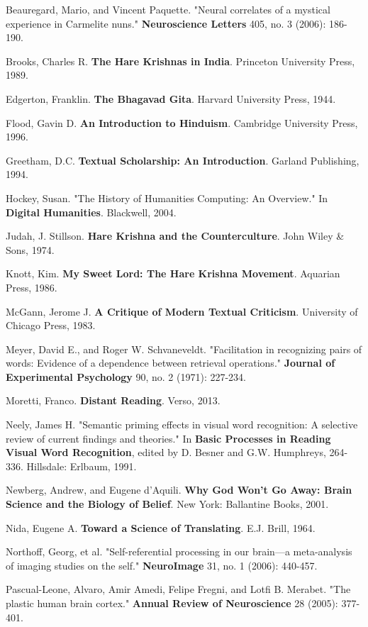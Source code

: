 \documentclass[11pt,twoside]{book}
\begin{document}
Beauregard, Mario, and Vincent Paquette. "Neural correlates of a mystical experience in Carmelite nuns." \textbf{Neuroscience Letters} 405, no. 3 (2006): 186-190.

Brooks, Charles R. \textbf{The Hare Krishnas in India}. Princeton University Press, 1989.

Edgerton, Franklin. \textbf{The Bhagavad Gita}. Harvard University Press, 1944.

Flood, Gavin D. \textbf{An Introduction to Hinduism}. Cambridge University Press, 1996.

Greetham, D.C. \textbf{Textual Scholarship: An Introduction}. Garland Publishing, 1994.

Hockey, Susan. "The History of Humanities Computing: An Overview." In \textbf{Digital Humanities}. Blackwell, 2004.

Judah, J. Stillson. \textbf{Hare Krishna and the Counterculture}. John Wiley \& Sons, 1974.

Knott, Kim. \textbf{My Sweet Lord: The Hare Krishna Movement}. Aquarian Press, 1986.

McGann, Jerome J. \textbf{A Critique of Modern Textual Criticism}. University of Chicago Press, 1983.

Meyer, David E., and Roger W. Schvaneveldt. "Facilitation in recognizing pairs of words: Evidence of a dependence between retrieval operations." \textbf{Journal of Experimental Psychology} 90, no. 2 (1971): 227-234.

Moretti, Franco. \textbf{Distant Reading}. Verso, 2013.

Neely, James H. "Semantic priming effects in visual word recognition: A selective review of current findings and theories." In \textbf{Basic Processes in Reading Visual Word Recognition}, edited by D. Besner and G.W. Humphreys, 264-336. Hillsdale: Erlbaum, 1991.

Newberg, Andrew, and Eugene d'Aquili. \textbf{Why God Won't Go Away: Brain Science and the Biology of Belief}. New York: Ballantine Books, 2001.

Nida, Eugene A. \textbf{Toward a Science of Translating}. E.J. Brill, 1964.

Northoff, Georg, et al. "Self-referential processing in our brain—a meta-analysis of imaging studies on the self." \textbf{NeuroImage} 31, no. 1 (2006): 440-457.

Pascual-Leone, Alvaro, Amir Amedi, Felipe Fregni, and Lotfi B. Merabet. "The plastic human brain cortex." \textbf{Annual Review of Neuroscience} 28 (2005): 377-401.
\end{document}
